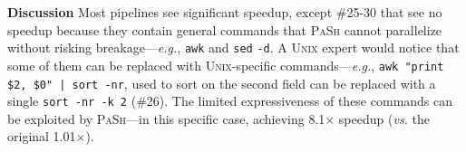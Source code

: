 \documentclass[sigplan, review, screen, anonymous]{acmart}
\newcommand{\eg}{{\em e.g.}, }
\newcommand{\vs}{{\em vs.} }
\newcommand{\heading}[1]{\vspace{4pt}\noindent\textbf{#1}\enspace}
\newcommand{\ttt}[1]{\texttt{#1}}
\newcommand{\todo}[1]{\hl{#1}\xspace}
\newcommand{\kk}[1]{[{\color{magenta}kk: #1}]}
\newcommand{\sx}[1]{(\S\ref{#1})}
\newcommand{\sys}{{\scshape PaSh}\xspace}
\newcommand{\unix}{{\scshape Unix}\xspace}
\begin{document}

\heading{Discussion}
Most pipelines see significant speedup, except \#25-30
  that see no speedup because they contain general commands that \sys cannot parallelize without risking breakage---\eg \ttt{awk} and \ttt{sed} \ttt{-d}. %
A \unix expert would notice that some of them can be replaced with \unix-specific commands---\eg \ttt{awk "{print \$2, \$0}" | sort -nr}, used to sort on the second field can be replaced with a single \ttt{sort -nr -k 2} (\#26).
The limited expressiveness of these commands can be exploited by \sys---in this specific case, achieving 8.1$\times$ speedup (\vs the original 1.01$\times$).


% 
% 
% 
\end{document}
